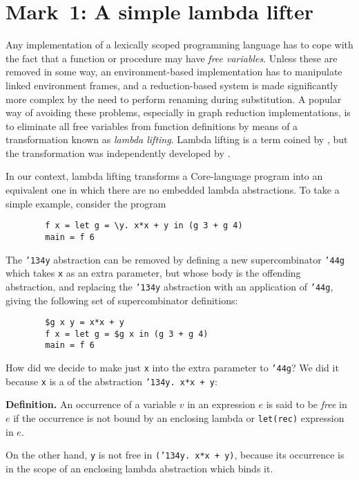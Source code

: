         \section{Mark~1: A simple lambda lifter}
        \label{ll:mk1}

Any implementation of a lexically scoped programming language has to
cope with the fact that a function or procedure may have {\em free
variables}.  Unless these are removed in some
way, an environment-based implementation has to manipulate linked
environment frames, and a reduction-based system is made significantly
more complex by the need to perform renaming during substitution.  A
popular way of avoiding these problems, especially in graph reduction
implementations, is to eliminate all free variables from function
definitions by means of a transformation known as {\em lambda
lifting}.  Lambda lifting is a term coined by \cite{JohnssonLL}, but
the transformation was independently developed by \cite{HughesThesis}.

In our context, lambda lifting transforms a Core-language program into
an equivalent one in which there are no embedded lambda abstractions.
To take a simple example, consider the program
\begin{verbatim}
        f x = let g = \y. x*x + y in (g 3 + g 4)
        main = f 6
\end{verbatim}
The \mbox{\tt {\char'134}y} abstraction
can be removed by defining a new supercombinator \mbox{\tt {\char'44}g} which takes
\mbox{\tt x} as an extra parameter, but whose body is the offending
abstraction, and replacing the \mbox{\tt {\char'134}y} abstraction with an application of
\mbox{\tt {\char'44}g}, giving the following
set of supercombinator definitions:
\begin{verbatim}
        $g x y = x*x + y
        f x = let g = $g x in (g 3 + g 4)
        main = f 6
\end{verbatim}
How did we decide to make just \mbox{\tt x} into the extra parameter to \mbox{\tt {\char'44}g}?
We did it because \mbox{\tt x} is a  of
the abstraction \mbox{\tt {\char'134}y.\ x*x\ +\ y}:
\begin{important}
{\bf Definition.} An occurrence of a variable $v$ in an expression $e$
is said to be {\em free\/} in $e$ if the occurrence
is not bound by an enclosing lambda or \mbox{\tt let(rec)} expression in $e$.
\end{important}
On the other hand, \mbox{\tt y} is not free in \mbox{\tt ({\char'134}y.\ x*x\ +\ y)}, because its
occurrence is in the scope of an enclosing lambda abstraction which
binds it.

